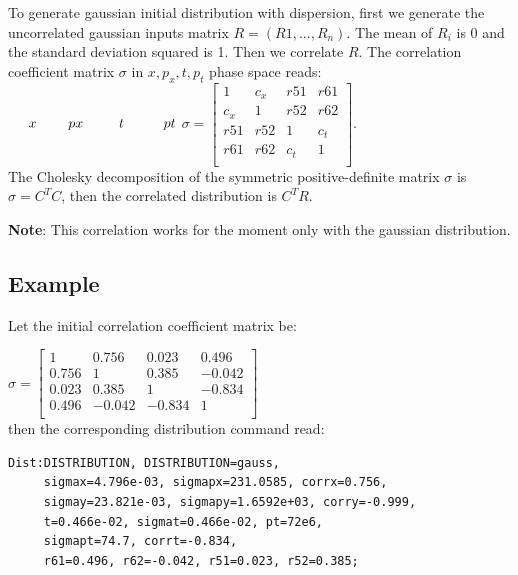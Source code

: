 To generate gaussian initial distribution with dispersion, first we
generate the uncorrelated gaussian inputs matrix $R=(R1,...,R_n)$.
The mean of $R_i$ is $0$ and the standard deviation squared is 1. Then
we correlate $R$.
The correlation coefficient matrix $\sigma$ in $x,p_x,t,p_t$ phase space reads: \\

$ \hspace{0.5cm}x \hspace{0.8cm}  px  \hspace{0.9cm} t\hspace{1.0cm} pt\\$
$\sigma= \left[
\begin{array}{cccc}
1    &c_x&r51    &r61\\
c_x&1    &r52    &r62\\
r51  &r52  &1      &c_t\\
r61  &r62  &c_t  &1\\
\end{array}
\right].$ \\

The Cholesky decomposition of the symmetric positive-definite matrix $\sigma$ is $\sigma=C^TC$, then the correlated distribution is $C^TR$.

\textbf{Note}: This correlation works for the moment only with the gaussian distribution.

\subsection{Example}
Let the initial correlation coefficient matrix be:

$\sigma= \left[
\begin{array}{cccc}
1      &0.756  &0.023    &0.496\\
0.756  &1      &0.385    &-0.042\\
0.023  &0.385  &1        &-0.834\\
0.496  &-0.042 &-0.834   &1\\

\end{array}
\right]$ \\
then the corresponding distribution command read:
\begin{verbatim}
Dist:DISTRIBUTION, DISTRIBUTION=gauss,
     sigmax=4.796e-03, sigmapx=231.0585, corrx=0.756,
     sigmay=23.821e-03, sigmapy=1.6592e+03, corry=-0.999,
     t=0.466e-02, sigmat=0.466e-02, pt=72e6, 
     sigmapt=74.7, corrt=-0.834,
     r61=0.496, r62=-0.042, r51=0.023, r52=0.385;
\end{verbatim}

